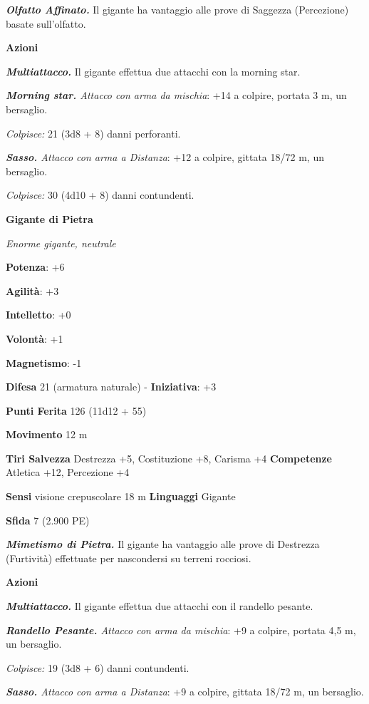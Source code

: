 \begin{multicols}{2}
\emph{\textbf{Olfatto Affinato.}} Il gigante ha vantaggio alle prove di
Saggezza (Percezione) basate sull'olfatto.

\smallskip\textbf{Azioni}

\emph{\textbf{Multiattacco.}} Il gigante effettua due attacchi con la
morning star.

\emph{\textbf{Morning star.} Attacco con arma da mischia}: +14 a
colpire, portata 3 m, un bersaglio.

\emph{Colpisce:} 21 (3d8 + 8) danni perforanti.

\emph{\textbf{Sasso.} Attacco con arma a Distanza}: +12 a colpire,
gittata 18/72 m, un bersaglio.

\emph{Colpisce:} 30 (4d10 + 8) danni contundenti.

\textbf{Gigante di Pietra}

\emph{Enorme gigante, neutrale}

\textbf{Potenza}: +6

\textbf{Agilità}: +3

\textbf{Intelletto}: +0

\textbf{Volontà}: +1

\textbf{Magnetismo}: -1

\textbf{Difesa} 21 (armatura naturale) - \textbf{Iniziativa}: +3

\textbf{Punti Ferita} 126 (11d12 + 55)

\textbf{Movimento} 12 m

\textbf{Tiri Salvezza} Destrezza +5, Costituzione +8, Carisma +4
\textbf{Competenze} Atletica +12, Percezione +4

\textbf{Sensi} visione crepuscolare 18 m
\textbf{Linguaggi} Gigante

\textbf{Sfida} 7 (2.900 PE)\smallskip

\emph{\textbf{Mimetismo di Pietra.}} Il gigante ha vantaggio alle prove
di Destrezza (Furtività) effettuate per nascondersi su terreni rocciosi.

\smallskip\textbf{Azioni}

\emph{\textbf{Multiattacco.}} Il gigante effettua due attacchi con il
randello pesante.

\emph{\textbf{Randello Pesante.} Attacco con arma da mischia}: +9 a
colpire, portata 4,5 m, un bersaglio.

\emph{Colpisce:} 19 (3d8 + 6) danni contundenti.

\emph{\textbf{Sasso.} Attacco con arma a Distanza}: +9 a colpire,
gittata 18/72 m, un bersaglio.


\end{multicols}
